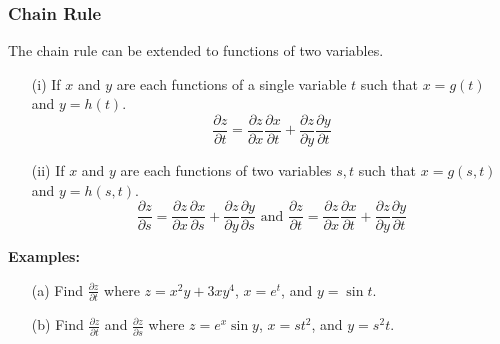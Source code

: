 \documentclass{beamer}
\begin{document}
\begin{frame}
\frametitle{Chain Rule}
The chain rule can be extended to functions of two variables.
\begin{itemize}
	\item[(i)] If $x$ and $y$ are each functions of a single variable $t$ such that $x=g(t)$ and $y=h(t)$.
	$$\frac{\partial z}{\partial t} = \frac{\partial z}{\partial x} \frac{\partial x}{\partial t} + \frac{\partial z}{\partial y} \frac{\partial y}{\partial t}$$
	\item[(ii)] If $x$ and $y$ are each functions of two variables $s,t$ such that $x=g(s,t)$ and $y=h(s,t)$.
	$$\frac{\partial z}{\partial s} = \frac{\partial z}{\partial x} \frac{\partial x}{\partial s} + \frac{\partial z}{\partial y} \frac{\partial y}{\partial s} \mbox{ and }
	\frac{\partial z}{\partial t} = \frac{\partial z}{\partial x} \frac{\partial x}{\partial t} + \frac{\partial z}{\partial y} \frac{\partial y}{\partial t}$$
\end{itemize}

\vspace{6pt}
\textbf{Examples:}
\begin{itemize}
	\item[(a)] Find $\frac{\partial z}{\partial t}$ where $z=x^2y + 3xy^4$, $x=e^t$, and $y=\sin t$.
	\item[(b)] Find  $\frac{\partial z}{\partial t}$ and  $\frac{\partial z}{\partial s}$ where $z=e^x\sin y$, $x=st^2$, and $y=s^2t$.
	
\end{itemize}
\end{frame}
\end{document}
